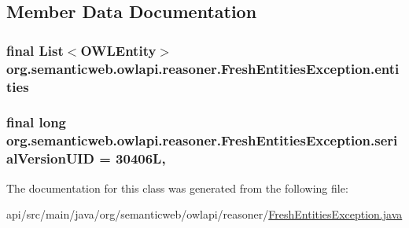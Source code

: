\subsection{Member Data Documentation}
\hypertarget{classorg_1_1semanticweb_1_1owlapi_1_1reasoner_1_1_fresh_entities_exception_a9a025a60031c37906a4df5df6dd5584e}{
\subsubsection[{entities}]{\setlength{\rightskip}{0pt plus 5cm}final List$<${\bf O\-W\-L\-Entity}$>$ org.\-semanticweb.\-owlapi.\-reasoner.\-Fresh\-Entities\-Exception.\-entities\hspace{0.3cm}{\ttfamily [private]}}}\label{classorg_1_1semanticweb_1_1owlapi_1_1reasoner_1_1_fresh_entities_exception_a9a025a60031c37906a4df5df6dd5584e}
\hypertarget{classorg_1_1semanticweb_1_1owlapi_1_1reasoner_1_1_fresh_entities_exception_aeaf992e33c80cb187e6e70914f1d9057}{
\subsubsection[{serial\-Version\-U\-I\-D}]{\setlength{\rightskip}{0pt plus 5cm}final long org.\-semanticweb.\-owlapi.\-reasoner.\-Fresh\-Entities\-Exception.\-serial\-Version\-U\-I\-D = 30406\-L\hspace{0.3cm}{\ttfamily [static]}, {\ttfamily [private]}}}\label{classorg_1_1semanticweb_1_1owlapi_1_1reasoner_1_1_fresh_entities_exception_aeaf992e33c80cb187e6e70914f1d9057}


The documentation for this class was generated from the following file\-:\begin{DoxyCompactItemize}
\item 
api/src/main/java/org/semanticweb/owlapi/reasoner/\hyperlink{_fresh_entities_exception_8java}{Fresh\-Entities\-Exception.\-java}\end{DoxyCompactItemize}
